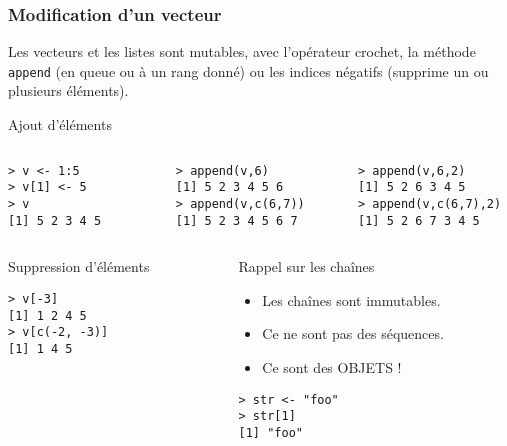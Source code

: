 \documentclass[10pt]{beamer}
\begin{document}
\begin{frame}[fragile]
  \frametitle{Modification d'un vecteur}
  Les vecteurs et les listes sont mutables, avec l'opérateur crochet, la méthode \texttt{append} (en queue ou à un rang donné) ou les indices négatifs (supprime un ou plusieurs éléments).
  \begin{exampleblock}{Ajout d'éléments}
\begin{columns}[t]
\begin{column}{0.33\textwidth}
  \begin{lstlisting}
> v <- 1:5
> v[1] <- 5
> v
[1] 5 2 3 4 5      
\end{lstlisting}
\end{column}
\begin{column}{0.33\textwidth}
  \begin{lstlisting}
> append(v,6)
[1] 5 2 3 4 5 6
> append(v,c(6,7))
[1] 5 2 3 4 5 6 7    
  \end{lstlisting}
\end{column}
\begin{column}{0.34\textwidth}
  \begin{lstlisting}
> append(v,6,2) 
[1] 5 2 6 3 4 5
> append(v,c(6,7),2)
[1] 5 2 6 7 3 4 5  
\end{lstlisting}
\end{column}

\end{columns}
\end{exampleblock}


\begin{columns}[t]
\begin{column}{0.43\textwidth}
\begin{exampleblock}{Suppression d'éléments}
  \begin{lstlisting}[style=block]
> v[-3]
[1] 1 2 4 5
> v[c(-2, -3)]
[1] 1 4 5
\end{lstlisting}  
\end{exampleblock}
\end{column}
\begin{column}{0.53\textwidth}
  \begin{block}{Rappel sur les chaînes}
    \begin{itemize}
    \item Les chaînes sont immutables.
    \item Ce ne sont pas des séquences.
    \item Ce sont des OBJETS !
    \end{itemize}

  \begin{lstlisting}
> str <- "foo"
> str[1]
[1] "foo"
\end{lstlisting}
\end{block}
\end{column}
\end{columns}
\end{frame}
\end{document}
